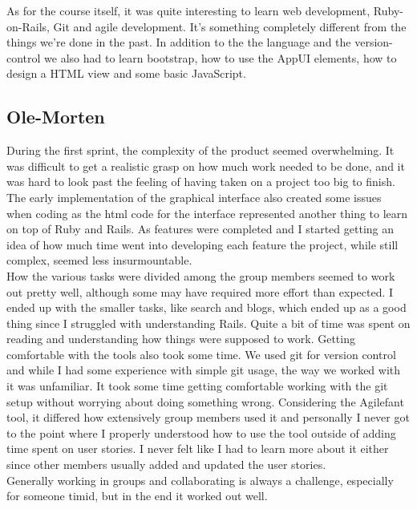 \documentclass[a4paper]{article}
\begin{document}
\noindent
As for the course itself, it was quite interesting to learn web development, Ruby-on-Rails, Git and agile development. It's something completely different from the things we're done in the past. In addition to the the language and the version-control we also had to learn bootstrap, how to use the AppUI elements, how to design a HTML view and some basic JavaScript. 

\subsection{Ole-Morten}
\noindent
During the first sprint, the complexity of the product seemed overwhelming. It was difficult to get a realistic grasp on how much work needed to be done, and it was hard to look past the feeling of having taken on a project too big to finish. The early implementation of the graphical interface also created some issues when coding as the html code for the interface represented another thing to learn on top of Ruby and Rails. As features were completed and I started getting an idea of how much time went into developing each feature the project, while still complex, seemed less insurmountable.\\

\noindent
How the various tasks were divided among the group members seemed to work out pretty well, although some may have required more effort than expected. I ended up with the smaller tasks, like search and blogs, which ended up as a good thing since I struggled with understanding Rails. Quite a bit of time was spent on reading and understanding how things were supposed to work. Getting comfortable with the tools also took some time. We used git for version control and while I had some experience with simple git usage, the way we worked with it was unfamiliar. It took some time getting comfortable working with the git setup without worrying about doing something wrong. Considering the Agilefant tool, it differed how extensively group members used it and personally I never got to the point where I properly understood how to use the tool outside of adding time spent on user stories. I never felt like I had to learn more about it either since other members usually added and updated the user stories.\\

\noindent
Generally working in groups and collaborating is always a challenge, especially for someone timid, but in the end it worked out well.
\end{document}
